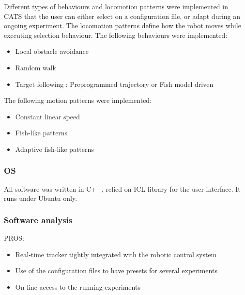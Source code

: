 \documentclass{styles/assisi}
\begin{document}
Different types of behaviours and locomotion patterns were implemented in CATS that the user can either select on a configuration file, or adapt during an ongoing experiment.
The locomotion patterns define how the robot moves while executing selection behaviour.
The following behaviours were implemented:
\begin{itemize}
  \item Local obstacle avoidance
  \item Random walk
  \item Target following : Preprogrammed trajectory or Fish model driven
\end{itemize}

The following motion patterns were implemented:
\begin{itemize}
  \item Constant linear speed
  \item Fish-like patterns
  \item Adaptive fish-like patterns
\end{itemize}

\subsubsection{OS}
All software was written in C++, relied on ICL library for the user interface. It runs under Ubuntu only. 

\subsubsection{Software analysis}
PROS:
\begin{itemize}
  \item Real-time tracker tightly integrated with the robotic control system 
  \item Use of the configuration files to have presets for several experiments
  \item On-line access to the running experiments
\end{itemize}
\end{document}
